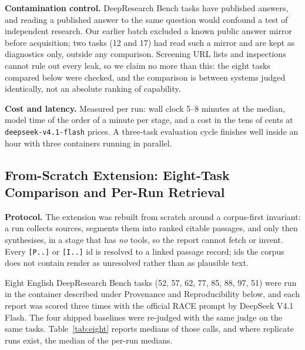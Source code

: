 \documentclass[conference]{IEEEtran}
\begin{document}
\textbf{Contamination control.} DeepResearch Bench tasks have published answers, and reading a published
answer to the same question would confound a test of independent research. Our earlier batch excluded a
known public answer mirror before acquisition; two tasks (12 and 17) had read such a mirror and are kept
as diagnostics only, outside any comparison. Screening URL lists and inspections cannot rule out every
leak, so we claim no more than this: the eight tasks compared below were checked, and the comparison is
between systems judged identically, not an absolute ranking of capability.

\textbf{Cost and latency.} Measured per run: wall clock 5--8 minutes at the median, model time of the
order of a minute per stage, and a cost in the tens of cents at \texttt{deepseek-v4.1-flash} prices. A
three-task evaluation cycle finishes well inside an hour with three containers running in parallel.

\subsection{From-Scratch Extension: Eight-Task Comparison and Per-Run Retrieval}
\label{sec:eight}

\textbf{Protocol.} The extension was rebuilt from scratch around a corpus-first invariant: a run collects sources, segments them into ranked citable passages, and only then synthesises, in a stage that has \emph{no} tools, so the report cannot fetch or invent. Every \texttt{[P..]} or \texttt{[I..]} id is resolved to a linked passage record; ids the corpus does not contain render as unresolved rather than as plausible text.

Eight English DeepResearch Bench tasks (52, 57, 62, 77, 85, 88, 97, 51) were run in the container described under Provenance and Reproducibility below, and each report was scored three times with the official RACE prompt by DeepSeek V4.1 Flash. The four shipped baselines were re-judged with the same judge on the same tasks. Table~\ref{tab:eight} reports medians of those calls, and where replicate runs exist, the median of the per-run medians.
\end{document}
